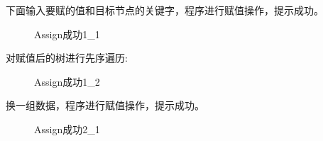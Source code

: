 \documentclass[supercite]{Experimental_Report}
\theoremstyle{definition}
\begin{document}
\noindent
下面输入要赋的值和目标节点的关键字，程序进行赋值操作，提示成功。
\begin{figure}[htbp]
	\centering
	\centering
	\caption{Assign成功1\_1}
	\label{fig5-17}
\end{figure}

\noindent
对赋值后的树进行先序遍历:
\begin{figure}[H]
	\centering
	\centering
	\caption{Assign成功1\_2}
	\label{fig5-18}
\end{figure}

\noindent
换一组数据，程序进行赋值操作，提示成功。
\begin{figure}[htbp]
	\centering
	\centering
	\caption{Assign成功2\_1}
	\label{fig5-19}
\end{figure}
\end{document}
